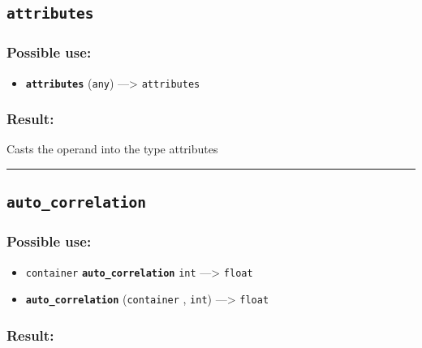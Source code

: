 \documentclass[]{book}
\providecommand{\tightlist}{%
  \setlength{\itemsep}{0pt}\setlength{\parskip}{0pt}}
\theoremstyle{definition}
\theoremstyle{definition}
\theoremstyle{definition}
\theoremstyle{remark}
\begin{document}
\subsection{\texorpdfstring{\texttt{attributes}}{attributes}}\label{attributes}

\subsubsection{Possible use:}\label{possible-use-61}

\begin{itemize}
\tightlist
\item
  \textbf{\texttt{attributes}} (\texttt{any}) ---\textgreater{}
  \texttt{attributes}
\end{itemize}

\subsubsection{Result:}\label{result-60}

Casts the operand into the type attributes

\begin{center}\rule{0.5\linewidth}{\linethickness}\end{center}

\subsection{\texorpdfstring{\texttt{auto\_correlation}}{auto\_correlation}}\label{auto_correlation}

\subsubsection{Possible use:}\label{possible-use-62}

\begin{itemize}
\tightlist
\item
  \texttt{container} \textbf{\texttt{auto\_correlation}} \texttt{int}
  ---\textgreater{} \texttt{float}
\item
  \textbf{\texttt{auto\_correlation}} (\texttt{container} ,
  \texttt{int}) ---\textgreater{} \texttt{float}
\end{itemize}

\subsubsection{Result:}\label{result-61}
\end{document}
